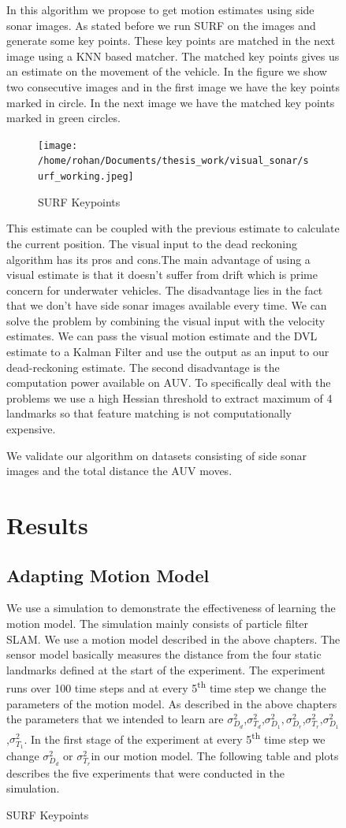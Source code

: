 \documentclass[12pt,draft]{dalcsthesis}
\begin{document}
{{\begin{figure}
{In this algorithm we propose to get motion estimates using side sonar
images. As stated before we run SURF on the images and generate some
key points. These key points are matched in the next image using a
KNN based matcher. The matched key points gives us an estimate on
the movement of the vehicle. In the figure we show two consecutive
images and in the first image we have the key points marked in circle.
In the next image we have the matched key points marked in green circles. 
\begin{figure}[hbtp]
\caption{SURF Keypoints}
\centering
\texttt{[image: /home/rohan/Documents/thesis\_work/visual\_sonar/surf\_working.jpeg]}
\end{figure}
This estimate can be coupled with the previous estimate to calculate
the current position. The visual input to the dead reckoning algorithm
has its pros and cons.The main advantage of using a visual estimate
is that it doesn't suffer from drift which is prime concern for underwater
vehicles. The disadvantage lies in the fact that we don't have side
sonar images available every time. We can solve the problem by combining
the visual input with the velocity estimates. We can pass the visual
motion estimate and the DVL estimate to a Kalman Filter and use the
output as an input to our dead-reckoning estimate. The second disadvantage
is the computation power available on AUV. To specifically deal with
the problems we use a high Hessian threshold to extract maximum of
4 landmarks so that feature matching is not computationally expensive. 

We validate our algorithm on datasets consisting of side sonar images
and the total distance the AUV moves. 


\chapter{Results}
\label{ch-: results motion estimation}
\section{Adapting Motion Model}
\label{results}
We use a simulation to demonstrate the effectiveness of learning the
motion model. The simulation mainly consists of particle filter SLAM.
We use a motion model described in the above chapters. The sensor
model basically measures the distance from the four static landmarks
defined at the start of the experiment. The experiment runs over 100
time steps and at every 5\textsuperscript{th} time step we change
the parameters of the motion model. As described in the above chapters
the parameters that we intended to learn are $\sigma_{D_{d}}^{2}$,$\sigma_{T_{d}}^{2}$,$\sigma_{D_{1}}^{2},\sigma_{D_{r}}^{2}$,$\sigma_{T_{r}}^{2}$,$\sigma_{D_{1}}^{2}$,$\sigma_{T_{1}}^{2}$.
In the first stage of the experiment at every 5\textsuperscript{th }time step
we change $\sigma_{D_{d}}^{2}$ or $\sigma_{T_{r}}^{2}$in our motion
model. The following table and plots describes the five experiments
that were conducted in the simulation.

}
\end{figure}}}
\end{document}
